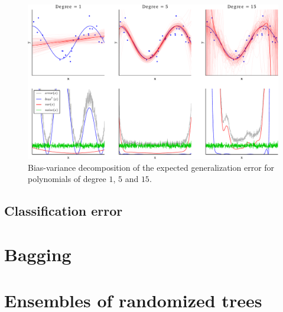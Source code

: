 \begin{figure}
    \centering
    \includegraphics[width=1.1\textwidth]{figures/ch4_overfitting.pdf}
    \caption{Bias-variance decomposition of the expected generalization error for polynomials of degree $1$, $5$ and $15$.}
    \label{fig:overfitting}
\end{figure}


\subsection{Classification error}

\section{Bagging}
\label{sec:4:bagging}




\section{Ensembles of randomized trees}
\label{sec:4:ensemble}


